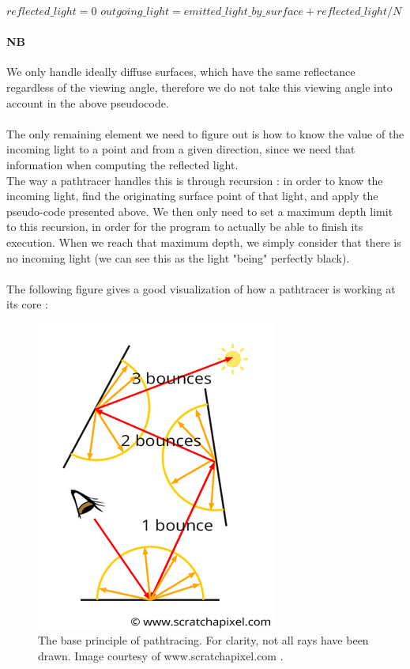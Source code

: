 \documentclass[12pt, oneside]{report}
\begin{document}
\clearpage

\begin{algorithm}[h]
$reflected\_light = 0$\;
$ outgoing\_light = emitted\_light\_by\_surface + reflected\_light / N$\;
\label{alg:basics}
\end{algorithm}

\paragraph{NB} We only handle ideally diffuse surfaces, which have the same reflectance regardless of the viewing angle, therefore we do not take this viewing angle into account in the above pseudocode.

\paragraph{} The only remaining element we need to figure out is how to know the value of the incoming light to a point and from a given direction, since we need that information when computing the reflected light. \\ The way a pathtracer handles this is through recursion : in order to know the incoming light, find the originating surface point of that light, and apply the pseudo-code presented above. We then only need to set a maximum depth limit to this recursion, in order for the program to actually be able to finish its execution. When we reach that maximum depth, we simply consider that there is no incoming light (we can see this as the light "being" perfectly black).

\paragraph{}The following figure gives a good visualization of how a pathtracer is working at its core :

\begin{figure}[h]
    \centering
    \includegraphics[width=0.3\linewidth]{pathtracing.png} 
    \caption{The base principle of pathtracing. For clarity, not all rays have been drawn. Image courtesy of www.scratchapixel.com \cite{scratchapixel}.}
    \label{fig:pathtracing}
\end{figure}
\end{document}
